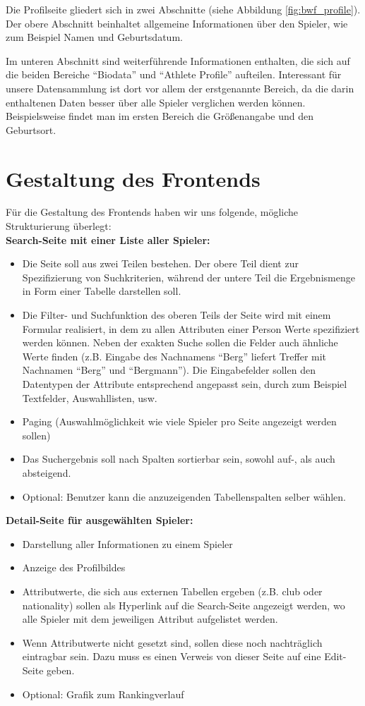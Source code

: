 Die Profilseite gliedert sich in zwei Abschnitte (siehe Abbildung \ref{fig:bwf_profile}). Der obere Abschnitt beinhaltet allgemeine Informationen über den Spieler, wie zum Beispiel Namen und Geburtsdatum. 

Im unteren Abschnitt sind weiterführende Informationen enthalten, die sich auf die beiden Bereiche "`Biodata"' und "`Athlete Profile"' aufteilen. Interessant für unsere Datensammlung ist dort vor allem der erstgenannte Bereich, da die darin enthaltenen Daten besser über alle Spieler verglichen werden können. Beispielsweise findet man im ersten Bereich die Größenangabe und den Geburtsort.

\section{Gestaltung des Frontends}
Für die Gestaltung des Frontends haben wir uns folgende, mögliche Strukturierung überlegt:\\

\noindent\textbf{Search-Seite mit einer Liste aller Spieler:}
\begin{itemize}
\item Die Seite soll aus zwei Teilen bestehen. Der obere Teil dient zur Spezifizierung von Suchkriterien, während der untere Teil die Ergebnismenge in Form einer Tabelle darstellen soll.
\item Die Filter- und Suchfunktion des oberen Teils der Seite wird mit einem Formular realisiert, in dem zu allen Attributen einer Person Werte spezifiziert werden können. Neben der exakten Suche sollen die Felder auch ähnliche Werte finden (z.B. Eingabe des Nachnamens "`Berg"' liefert Treffer mit Nachnamen "`Berg"' und "`Bergmann"'). Die Eingabefelder sollen den Datentypen der Attribute entsprechend angepasst sein, durch zum Beispiel Textfelder, Auswahllisten, usw.
\item Paging (Auswahlmöglichkeit wie viele Spieler pro Seite angezeigt werden sollen)
\item Das Suchergebnis soll nach Spalten sortierbar sein, sowohl auf-, als auch absteigend.
\item Optional: Benutzer kann die anzuzeigenden Tabellenspalten selber wählen.
\end{itemize}

\noindent\textbf{Detail-Seite für ausgewählten Spieler:}
\begin{itemize}
\item Darstellung aller Informationen zu einem Spieler
\item Anzeige des Profilbildes
\item Attributwerte, die sich aus externen Tabellen ergeben (z.B. club oder nationality) sollen als Hyperlink auf die Search-Seite angezeigt werden, wo alle Spieler mit dem jeweiligen Attribut aufgelistet werden.
\item Wenn Attributwerte nicht gesetzt sind, sollen diese noch nachträglich eintragbar sein. Dazu muss es einen Verweis von dieser Seite auf eine Edit-Seite geben.
\item Optional: Grafik zum Rankingverlauf
\end{itemize}

